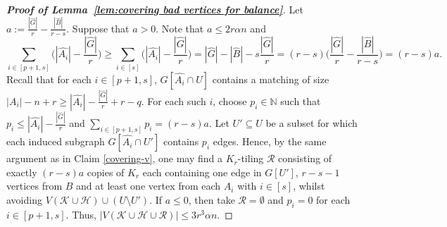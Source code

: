 \documentclass[11pt, a4paper]{article}
\theoremstyle{definition}
\newcommand{\<}{\subseteq}
\begin{document}
\begin{proof}[{\bf Proof of Lemma~\ref{lem:covering bad vertices for balance}}]
{Let $a:=\frac{|\hat{G}|}{r}-\frac{|\hat{B}|}{r-s}$. Suppose that  $a>0$. Note that $a\leq 2r\alpha n$ and  
$$
\sum_{i\in [p+1,s]}\Big(|\hat{A_i}|-\frac{|\hat{G}|}{r}\Big)\geq\sum_{i\in [s]}\Big(|\hat{A_i}|-\frac{|\hat{G}|}{r}\Big)=|\hat{G}|-|\hat{B}|-s\frac{|\hat{G}|}{r}=(r-s)\Big(\frac{|\hat{G}|}{r}-\frac{|\hat{B}|}{r-s}\Big)=(r-s)a.
$$
Recall that for each $i\in [p+1,s]$,  $G[\hat{A_i}\cap U]$ contains a matching of size $|A_i|-n+r\geq |\hat{A_i}|-\frac{|\hat{G}|}{r}+r-q$. For  each such $i$, choose $p_i\in \mathbb{N}$ such that $p_i\leq |\hat{A_i}|-\frac{|\hat{G}|}{r}$ and  $\sum_{i\in [p+1,s]}p_i=(r-s)a$. Let $U'\subseteq U$ be a subset for which each induced subgraph $G[\hat{A_i}\cap U']$ contains $p_i$ edges. %
Hence, by the same argument as in Claim \ref{covering-v}, one may find a $K_r$-tiling $\mathcal{R}$ consisting of exactly $(r-s)a$ copies of $K_r$ each containing one edge in $G[U']$, $r-s-1$ vertices from $B$ and at least one vertex from each $A_i$ with $i\in[s]$, whilst avoiding $V(\mathcal{K}\cup \mathcal{H})\cup (U\setminus U')$.  If $a\leq 0$, then take $\mathcal{R}=\emptyset$ and $p_i=0$ for each $i\in [p+1,s]$. Thus, $|V(\mathcal{K}\cup \mathcal{H}\cup \mathcal{R})|\leq 3r^3\alpha n$.}


\end{proof}
\end{document}
